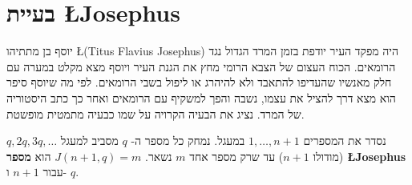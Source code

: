 
\section{בעיית \L{\large Josephus}}\label{s.josephus}

יוסף בן מתתיהו 
\L{(Titus Flavius Josephus)}
היה מפקד העיר יודפת בזמן המרד הגדול נגד הרומאים. הכוח העצום של הצבא הרומי מחץ את הגנת העיר ויוסף מצא מקלט במערה עם חלק מאנשיו שהעדיפו להתאבד ולא להיהרג או ליפול בשבי הרומאים. לפי מה שיוסף סיפר הוא מצא דרך להציל את עצמו, נשבה והפך למשקיף עם הרומאים ואחר כך כתב היסטוריה של המרד. נציג את הבעיה הקרויה על שמו כבעיה מתמטית מופשטת.
\begin{definition}
נסדר את המספרים
$1,\ldots,n\!+\!1$
במעגל. נמחק כל מספר ה-%
$q$
מסביב למעגל
$q, 2q, 3q, \ldots$
(מודולו
$n\!+\!1$)
עד שרק מספר אחד 
$m$
נשאר.
$J(n+1,q)=m$
הוא
\textbf{מספר \L{Josephus}}
עבור
$n+1$
ו-%
$q$.
\end{definition}
